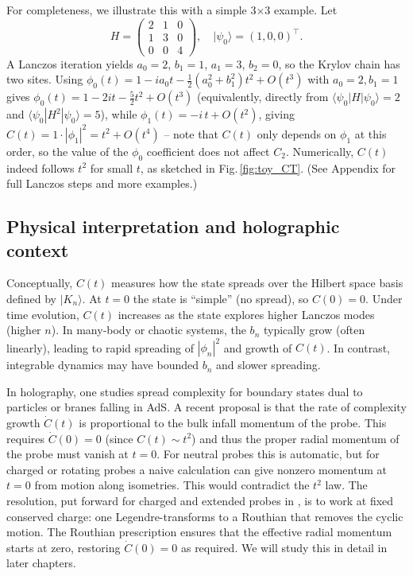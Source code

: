 \documentclass[11pt]{article}
\begin{document}
For completeness, we illustrate this with a simple 3×3 example.  Let 
\begin{equation*}
H = \begin{pmatrix}
2 & 1 & 0\\
1 & 3 & 0\\
0 & 0 & 4
\end{pmatrix}, 
\quad
|\psi_0\rangle = (1,0,0)^\top.
\end{equation*}
A Lanczos iteration yields $a_0=2$, $b_1=1$, $a_1=3$, $b_2=0$, so the Krylov chain has two sites.  Using $\phi_0(t)=1-ia_0t-\tfrac12(a_0^2+b_1^2)t^2+O(t^3)$ with $a_0=2,b_1=1$ gives $\phi_0(t)=1-2it-\tfrac52t^2+O(t^3)$ (equivalently, directly from $\langle\psi_0|H|\psi_0\rangle=2$ and $\langle\psi_0|H^2|\psi_0\rangle=5$), while $\phi_1(t)=-i\,t+O(t^2)$, giving $C(t)=1\cdot|\phi_1|^2 = t^2+O(t^4)$ -- note that $C(t)$ only depends on $\phi_1$ at this order, so the value of the $\phi_0$ coefficient does not affect $C_2$.  Numerically, $C(t)$ indeed follows $t^2$ for small $t$, as sketched in Fig.\,\ref{fig:toy_CT}.  (See Appendix for full Lanczos steps and more examples.)

\subsection{Physical interpretation and holographic context}

Conceptually, $C(t)$ measures how the state spreads over the Hilbert space basis defined by $|K_n\rangle$.  At $t=0$ the state is ``simple'' (no spread), so $C(0)=0$.  Under time evolution, $C(t)$ increases as the state explores higher Lanczos modes (higher $n$).  In many-body or chaotic systems, the $b_n$ typically grow (often linearly), leading to rapid spreading of $|\phi_n|^2$ and growth of $C(t)$.  In contrast, integrable dynamics may have bounded $b_n$ and slower spreading.

In holography, one studies spread complexity for boundary states dual to particles or branes falling in AdS.  A recent proposal \cite{Caputa:2024odg} is that the rate of complexity growth $\dot C(t)$ is proportional to the bulk infall momentum of the probe.  This requires $\dot C(0)=0$ (since $C(t)\sim t^2$) and thus the proper radial momentum of the probe must vanish at $t=0$.  For neutral probes this is automatic, but for charged or rotating probes a naive calculation can give nonzero momentum at $t=0$ from motion along isometries.  This would contradict the $t^2$ law.  The resolution, put forward for charged and extended probes in \cite{Chatzis:2026ekd}, is to work at fixed conserved charge: one Legendre-transforms to a Routhian that removes the cyclic motion.  The Routhian prescription ensures that the effective radial momentum starts at zero, restoring $\dot C(0)=0$ as required.  We will study this in detail in later chapters.
\end{document}
